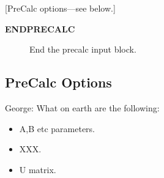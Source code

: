 \documentclass[openany,a4paper,10pt]{manual}
\begin{document}
{[}PreCalc options---see below.{]}
\begin{description}
\item[\textbf{ENDPRECALC}]
End the precalc input block.

\end{description}


\subsection{PreCalc Options}

\begin{notice}[note]
George:
What on earth are the following:
\begin{itemize}
\item {} 
A,B etc parameters.

\item {} 
XXX.

\item {} 
U matrix.

\end{itemize}
\end{notice}
\end{document}
